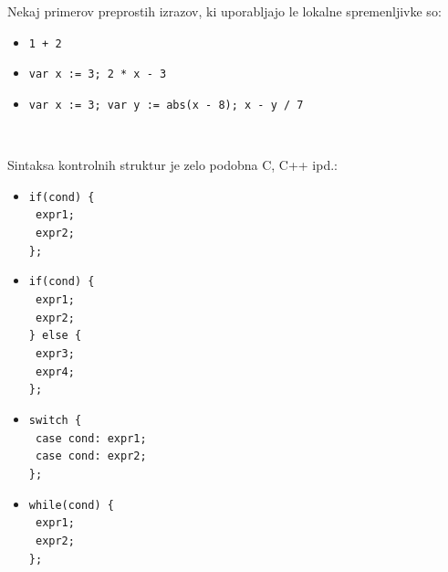 \documentclass[12pt]{report}
\newcommand{\wdot}{\textcolor{white}{.}}
\begin{document}
		\begin{spacing}{0.15}
		\parbox{\textwidth}{Nekaj primerov preprostih izrazov, ki uporabljajo le lokalne spremenljivke so:\\
		\begin{itemize}
			\item \texttt{1 + 2}
			\item \texttt{var x := 3; 2 * x - 3}
			\item \texttt{var x := 3; var y := abs(x - 8); x - y / 7}
		\end{itemize}}
		\end{spacing}
		\begin{spacing}{1.5}
			\wdot
		\end{spacing}
		\parbox{\textwidth}{\begin{spacing}{0}
		Sintaksa kontrolnih struktur je zelo podobna C, C++ ipd.:
		\begin{itemize}
			\item \parbox{\textwidth}{\vspace{5px}\texttt{if(cond) \{\\\wdot\qquad expr1;\\ \wdot\qquad expr2;\\\};}\vspace{5px}}
			\item \parbox{\textwidth}{\vspace{5px}\texttt{if(cond) \{\\\wdot\qquad expr1;\\ \wdot\qquad expr2;\\\} else \{\\\wdot\qquad expr3;\\ \wdot\qquad expr4;\\\};}\vspace{5px}}
			\item \parbox{\textwidth}{\vspace{5px}\texttt{switch \{\\\wdot\qquad case cond: expr1;\\ \wdot\qquad case cond: expr2;\\\};}\vspace{5px}}
			\item \parbox{\textwidth}{\vspace{5px}\texttt{while(cond) \{\\\wdot\qquad expr1;\\ \wdot\qquad expr2;\\\};}\vspace{5px}}

\end{itemize}
\end{spacing}}
\end{document}
